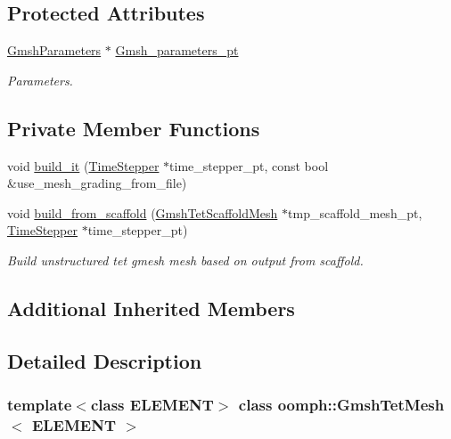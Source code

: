 \subsection*{Protected Attributes}
\begin{DoxyCompactItemize}
\item 
\hyperlink{classoomph_1_1GmshParameters}{Gmsh\+Parameters} $\ast$ \hyperlink{classoomph_1_1GmshTetMesh_a6d9878df9dfca45b4883909ed1e78536}{Gmsh\+\_\+parameters\+\_\+pt}
\begin{DoxyCompactList}\small\item\em Parameters. \end{DoxyCompactList}\end{DoxyCompactItemize}
\subsection*{Private Member Functions}
\begin{DoxyCompactItemize}
\item 
void \hyperlink{classoomph_1_1GmshTetMesh_aaec22ccd211f81dd440e9618d6667718}{build\+\_\+it} (\hyperlink{classoomph_1_1TimeStepper}{Time\+Stepper} $\ast$time\+\_\+stepper\+\_\+pt, const bool \&use\+\_\+mesh\+\_\+grading\+\_\+from\+\_\+file)
\item 
void \hyperlink{classoomph_1_1GmshTetMesh_a80132087ae6dd00c7631823a8453e078}{build\+\_\+from\+\_\+scaffold} (\hyperlink{classoomph_1_1GmshTetScaffoldMesh}{Gmsh\+Tet\+Scaffold\+Mesh} $\ast$tmp\+\_\+scaffold\+\_\+mesh\+\_\+pt, \hyperlink{classoomph_1_1TimeStepper}{Time\+Stepper} $\ast$time\+\_\+stepper\+\_\+pt)
\begin{DoxyCompactList}\small\item\em Build unstructured tet gmesh mesh based on output from scaffold. \end{DoxyCompactList}\end{DoxyCompactItemize}
\subsection*{Additional Inherited Members}


\subsection{Detailed Description}
\subsubsection*{template$<$class E\+L\+E\+M\+E\+NT$>$\newline
class oomph\+::\+Gmsh\+Tet\+Mesh$<$ E\+L\+E\+M\+E\+N\+T $>$}

